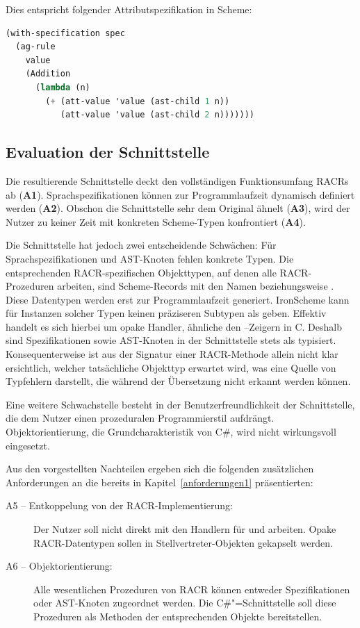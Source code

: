 Dies entspricht folgender Attributspezifikation in Scheme:

\begin{lstlisting}[language=scm]
(with-specification spec
  (ag-rule
    value
    (Addition
      (lambda (n)
        (+ (att-value 'value (ast-child 1 n))
           (att-value 'value (ast-child 2 n)))))))
\end{lstlisting}

\subsection{Evaluation der Schnittstelle}\label{evaluation1}

Die resultierende Schnittstelle deckt den vollständigen Funktionsumfang RACRs ab (\textbf{A1}). Sprachspezifikationen können zur Programmlaufzeit dynamisch definiert werden (\textbf{A2}). Obschon die Schnittstelle sehr dem Original ähnelt (\textbf{A3}), wird der Nutzer zu keiner Zeit mit konkreten Scheme-Typen konfrontiert (\textbf{A4}).

Die Schnittstelle hat jedoch zwei entscheidende Schwächen: Für Sprachspezifikationen und AST-Knoten fehlen konkrete Typen. Die entsprechenden RACR-spezifischen Objekttypen, auf denen alle RACR-Prozeduren arbeiten, sind Scheme-Records mit den Namen  beziehungsweise . Diese Datentypen werden erst zur Programmlaufzeit generiert. IronScheme kann für Instanzen solcher Typen keinen präziseren Subtypen als  geben. Effektiv handelt es sich hierbei um opake Handler, ähnliche den –Zeigern in C. Deshalb sind Spezifikationen sowie AST-Knoten in der Schnittstelle stets als  typisiert. Konsequenterweise ist aus der Signatur einer RACR-Methode allein nicht klar ersichtlich, welcher tatsächliche Objekttyp erwartet wird, was eine Quelle von Typfehlern darstellt, die während der Übersetzung nicht erkannt werden können.

Eine weitere Schwachstelle besteht in der Benutzerfreundlichkeit der Schnittstelle, die dem Nutzer einen prozeduralen Programmierstil aufdrängt. Objektorientierung, die Grundcharakteristik von C\#, wird nicht wirkungsvoll eingesetzt.

Aus den vorgestellten Nachteilen ergeben sich die folgenden zusätzlichen Anforderungen an die bereits in Kapitel~\ref{anforderungen1} präsentierten:

\begin{description}
	\item[A5 – Entkoppelung von der RACR-Implementierung:] Der Nutzer soll nicht direkt mit den Handlern für  und  arbeiten. Opake RACR-Datentypen sollen in Stellvertreter-Objekten gekapselt werden.	
	\item[A6 – Objektorientierung:] Alle wesentlichen Prozeduren von RACR können entweder Spezifikationen oder AST-Knoten zugeordnet werden. Die C\#"=Schnittstelle soll diese Prozeduren als Methoden der entsprechenden Objekte bereitstellen.
\end{description}
